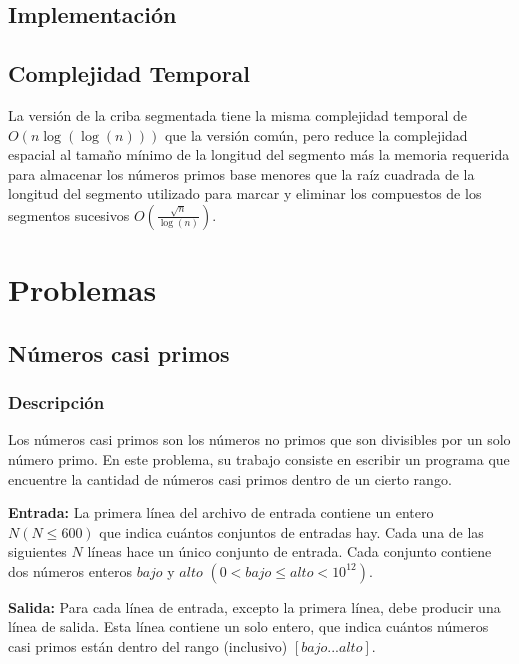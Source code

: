 \documentclass[12pt]{article}
\newcommand{\nl}{\vspace{0.3cm}}
\begin{document}
\subsection{Implementación}



\subsection{Complejidad Temporal}

\nl

La versión de la criba segmentada tiene la misma complejidad temporal de $O(n \log(\log(n)))$ que la versión común, pero reduce la complejidad espacial al tamaño mínimo de la longitud del segmento más la memoria requerida para almacenar los números primos base menores que la raíz cuadrada de la longitud del segmento utilizado para marcar y eliminar los compuestos de los segmentos sucesivos $O\left(\frac{\sqrt{n}}{\log(n)}\right)$.

\section{Problemas}

\subsection{Números casi primos}

\nl

\subsubsection{Descripción}

Los números casi primos son los números no primos que son divisibles por un solo número primo. En este problema, su trabajo consiste en escribir un programa que encuentre la cantidad de números casi primos dentro de un cierto rango.

\nl

\textbf{Entrada:} La primera línea del archivo de entrada contiene un entero $N (N \leqslant 600)$ que indica cuántos conjuntos de entradas hay. Cada una de las siguientes $N$ líneas hace un único conjunto de entrada. Cada conjunto contiene dos números enteros $bajo$ y $alto$ $(0 < bajo \leqslant alto < 10^{12})$.

\nl

\textbf{Salida:} Para cada línea de entrada, excepto la primera línea, debe producir una línea de salida. Esta línea contiene un solo entero, que indica cuántos números casi primos están dentro del rango (inclusivo) $[bajo ... alto]$.
\end{document}
